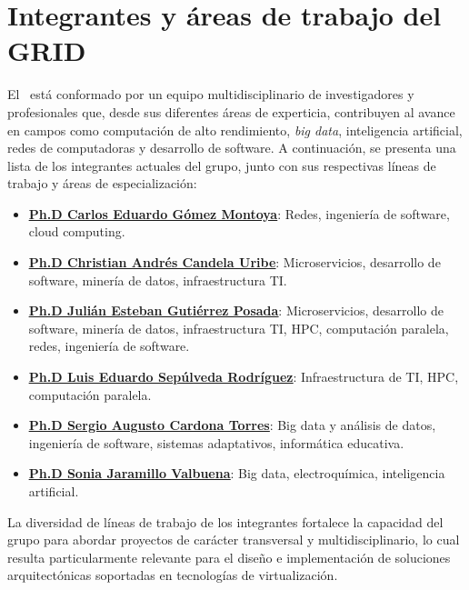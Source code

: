 

\section{Integrantes y áreas de trabajo del GRID}
\noindent
El \GRID\ está conformado por un equipo multidisciplinario de investigadores y profesionales que, desde sus diferentes áreas de experticia, contribuyen al avance en campos como computación de alto rendimiento, \textit{big data}, inteligencia artificial, redes de computadoras y desarrollo de software. A continuación, se presenta una lista de los integrantes actuales del grupo, junto con sus respectivas líneas de trabajo y áreas de especialización:
\begin{itemize}
  \item \href{https://scienti.minciencias.gov.co/cvlac/visualizador/generarCurriculoCv.do?cod_rh=0001343801}{\underline{{\textbf{Ph.D Carlos Eduardo Gómez Montoya}}}}: Redes, ingeniería de software, cloud computing.
  \item \href{https://scienti.minciencias.gov.co/cvlac/visualizador/generarCurriculoCv.do?cod_rh=0000210897}{\underline{{\textbf{Ph.D Christian Andrés Candela Uribe}}}}: Microservicios, desarrollo de software, minería de datos, infraestructura TI.\@
  \item \href{https://scienti.minciencias.gov.co/cvlac/visualizador/generarCurriculoCv.do?cod_rh=0000283495}{\underline{{\textbf{Ph.D Julián Esteban Gutiérrez Posada}}}}: Microservicios, desarrollo de software, minería de datos, infraestructura TI, HPC, computación paralela, redes, ingeniería de software.
  \item \href{https://scienti.minciencias.gov.co/cvlac/visualizador/generarCurriculoCv.do?cod_rh=0001383939}{\underline{{\textbf{Ph.D Luis Eduardo Sepúlveda Rodríguez}}}}: Infraestructura de TI, HPC, computación paralela.
  \item \href{https://scienti.minciencias.gov.co/cvlac/visualizador/generarCurriculoCv.do?cod_rh=0001398775}{\underline{{\textbf{Ph.D Sergio Augusto Cardona Torres}}}}: Big data y análisis de datos, ingeniería de software, sistemas adaptativos, informática educativa.
  \item \href{https://scienti.minciencias.gov.co/cvlac/visualizador/generarCurriculoCv.do?cod_rh=0000193550}{\underline{{\textbf{Ph.D Sonia Jaramillo Valbuena}}}}: Big data, electroquímica, inteligencia artificial.
\end{itemize}
\noindent
La diversidad de líneas de trabajo de los integrantes fortalece la capacidad del grupo para abordar proyectos de carácter transversal y multidisciplinario, lo cual resulta particularmente relevante para el diseño e implementación de soluciones arquitectónicas soportadas en tecnologías de virtualización.

